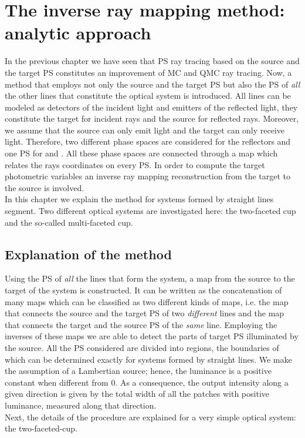 \chapter{The inverse ray mapping method: analytic approach}\label{chap:raymapping1}
In the previous chapter we have seen that PS ray tracing based on the source and the target PS constitutes an improvement of MC and QMC ray tracing. 
Now, a method that employs not only the source and the target PS but also the PS of \textit{all} the other lines that constitute the optical system is introduced. 
All lines can be modeled as detectors of the incident light and emitters of the reflected light, they constitute
the target for incident rays and the source for reflected rays.
Moreover, we assume that the source can only emit light and the target can only receive light.
Therefore, two different phase spaces are considered for the reflectors and one PS for
 and . All these phase spaces are connected through a map which relates the rays coordinates on every PS. In order to compute the target photometric variables an inverse ray mapping reconstruction from the target to the source is involved.
\\\indent
In this chapter we explain the method for systems formed by straight lines segment. 
Two different optical systems are investigated here: the two-faceted cup and the so-called multi-faceted cup.
\section{Explanation of the method}
Using the PS of \textit{all} the lines that form the system, a map from the source to the target of the system is constructed. It can be written as the concatenation of many maps which can be classified as two different kinds of maps, i.e. the map that connects the source and the target PS of two \textit{different} lines and the map that connects the target and the source PS of the \textit{same} line.
Employing the inverses of these maps we are able to detect the parts of target PS illuminated by the source.
All the PS considered are divided into regions, the boundaries of which can be determined exactly for systems formed by straight lines.
We make the assumption of a Lambertian source; hence, the luminance is a positive constant when different from $0$. 
As a consequence, the output intensity along a given direction is given by the total width of all the patches with positive luminance, measured along that direction.\\ \indent Next, the details of the procedure are explained for a very simple optical system: the two-faceted-cup.
